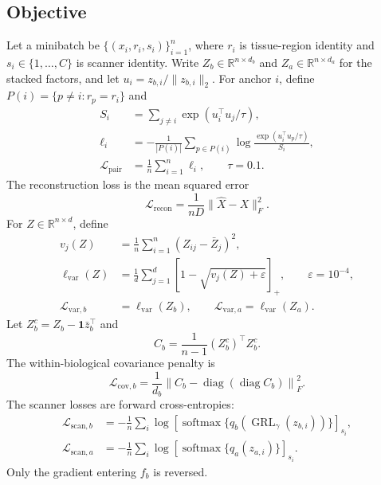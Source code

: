 \subsection{Objective}
Let a minibatch be $\{(x_i,r_i,s_i)\}_{i=1}^{n}$, where $r_i$ is tissue-region identity and $s_i\in\{1,\ldots,C\}$ is scanner identity. Write $Z_b\in\mathbb{R}^{n\times d_b}$ and $Z_a\in\mathbb{R}^{n\times d_a}$ for the stacked factors, and let $u_i=z_{b,i}/\lVert z_{b,i}\rVert_2$. For anchor $i$, define $P(i)=\{p\ne i:r_p=r_i\}$ and
\begin{align}
 S_i &= \sum_{j\ne i}\exp(u_i^{\top}u_j/\tau),\\
 \ell_i &= -\frac{1}{|P(i)|}\sum_{p\in P(i)}
 \log\frac{\exp(u_i^{\top}u_p/\tau)}{S_i},\\
 \mathcal{L}_{\mathrm{pair}} &= \frac{1}{n}\sum_{i=1}^{n}\ell_i,
 \qquad \tau=0.1.
\end{align}
The reconstruction loss is the mean squared error
\begin{equation}
 \mathcal{L}_{\mathrm{recon}}
 =\frac{1}{nD}\lVert\widehat{X}-X\rVert_F^2.
\end{equation}
For $Z\in\mathbb{R}^{n\times d}$, define
\begin{align}
 v_j(Z)&=\frac{1}{n}\sum_{i=1}^{n}(Z_{ij}-\bar Z_j)^2,\\
 \ell_{\mathrm{var}}(Z)
 &=\frac{1}{d}\sum_{j=1}^{d}
 \left[1-\sqrt{v_j(Z)+\varepsilon}\right]_{+},
 \qquad \varepsilon=10^{-4},\\
 \mathcal{L}_{\mathrm{var},b}&=\ell_{\mathrm{var}}(Z_b),\qquad
 \mathcal{L}_{\mathrm{var},a}=\ell_{\mathrm{var}}(Z_a).
\end{align}
Let $Z_b^c=Z_b-\mathbf{1}\bar z_b^{\top}$ and
\begin{equation}
 C_b=\frac{1}{n-1}(Z_b^c)^{\top}Z_b^c.
\end{equation}
The within-biological covariance penalty is
\begin{equation}
 \mathcal{L}_{\mathrm{cov},b}
 =\frac{1}{d_b}
  \left\lVert C_b-\operatorname{diag}(\operatorname{diag}C_b)\right\rVert_F^2.
\end{equation}
The scanner losses are forward cross-entropies:
\begin{align}
 \mathcal{L}_{\mathrm{scan},b}
 &=-\frac{1}{n}\sum_i
 \log\!\left[\operatorname{softmax}
 \{q_b(\operatorname{GRL}_{\gamma}(z_{b,i}))\}\right]_{s_i},\\
 \mathcal{L}_{\mathrm{scan},a}
 &=-\frac{1}{n}\sum_i
 \log\!\left[\operatorname{softmax}\{q_a(z_{a,i})\}\right]_{s_i}.
\end{align}
Only the gradient entering $f_b$ is reversed.

